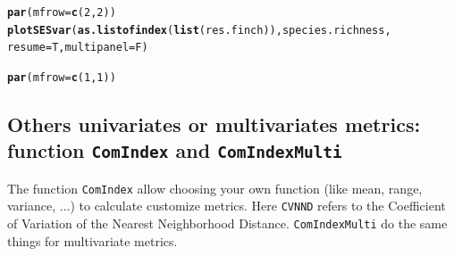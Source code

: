 \documentclass[12pt]{article}\usepackage[]{graphicx}\usepackage[]{color}
\makeatletter
\newcommand{\hlnum}[1]{\textcolor[rgb]{0.686,0.059,0.569}{#1}}%
\newcommand{\hlstd}[1]{\textcolor[rgb]{0.345,0.345,0.345}{#1}}%
\newcommand{\hlkwc}[1]{\textcolor[rgb]{0.333,0.667,0.333}{#1}}%
\newcommand{\hlkwd}[1]{\textcolor[rgb]{0.737,0.353,0.396}{\textbf{#1}}}%
\newenvironment{kframe}{%
 \def\at@end@of@kframe{}%
 \ifinner\ifhmode%
  \def\at@end@of@kframe{\end{minipage}}%
  \begin{minipage}{\columnwidth}%
 \fi\fi%
 \def\FrameCommand##1{\hskip\@totalleftmargin \hskip-\fboxsep
 \colorbox{shadecolor}{##1}\hskip-\fboxsep
     \hskip-\linewidth \hskip-\@totalleftmargin \hskip\columnwidth}%
 \MakeFramed {\advance\hsize-\width
   \@totalleftmargin\z@ \linewidth\hsize
   \@setminipage}}%
 {\par\unskip\endMakeFramed%
 \at@end@of@kframe}
\newenvironment{knitrout}{}{} %
\makeatother
\begin{document}
\begin{knitrout}
\color{fgcolor}\begin{kframe}
\begin{alltt}
\hlkwd{par}\hlstd{(}\hlkwc{mfrow} \hlstd{=} \hlkwd{c}\hlstd{(}\hlnum{2}\hlstd{,}\hlnum{2}\hlstd{))}
\hlkwd{plotSESvar}\hlstd{(}\hlkwd{as.listofindex}\hlstd{(}\hlkwd{list}\hlstd{(res.finch)), species.richness,}
       \hlkwc{resume} \hlstd{= T,} \hlkwc{multipanel} \hlstd{= F)}
\end{alltt}


{\ttfamily\noindent\bfseries{}}\begin{alltt}
\hlkwd{par}\hlstd{(}\hlkwc{mfrow} \hlstd{=} \hlkwd{c}\hlstd{(}\hlnum{1}\hlstd{,}\hlnum{1}\hlstd{))}
\end{alltt}
\end{kframe}
\end{knitrout}


\newpage
\subsection{Others univariates or multivariates metrics: function \texttt{ComIndex} and \texttt{ComIndexMulti}}

The function \texttt{ComIndex} allow choosing your own function (like mean, range, variance, ...) to calculate customize metrics. Here \texttt{CVNND} refers to the Coefficient of Variation of the Nearest Neighborhood Distance. \texttt{ComIndexMulti} do the same things for multivariate metrics. 
\end{document}
